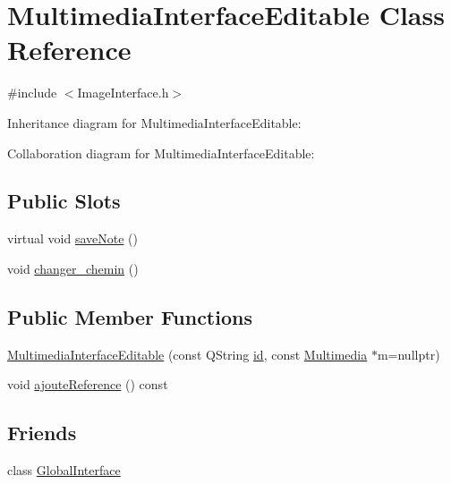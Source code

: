 \hypertarget{classMultimediaInterfaceEditable}{}\section{Multimedia\+Interface\+Editable Class Reference}
\label{classMultimediaInterfaceEditable}


{\ttfamily \#include $<$Image\+Interface.\+h$>$}



Inheritance diagram for Multimedia\+Interface\+Editable\+:


Collaboration diagram for Multimedia\+Interface\+Editable\+:
\subsection*{Public Slots}
\begin{DoxyCompactItemize}
\item 
virtual void \hyperlink{classMultimediaInterfaceEditable_a3b1ba30cbcf5d8276afd1674b1bb5885}{save\+Note} ()
\item 
void \hyperlink{classMultimediaInterfaceEditable_ab284b056d3eb91205da29aa78ccef7df}{changer\+\_\+chemin} ()
\end{DoxyCompactItemize}
\subsection*{Public Member Functions}
\begin{DoxyCompactItemize}
\item 
\hyperlink{classMultimediaInterfaceEditable_acaa968a37e43d20da750cb67fa50280e}{Multimedia\+Interface\+Editable} (const Q\+String \hyperlink{classNoteInterfaceEditable_a644ed9be4e9882c784a2667748d8501d}{id}, const \hyperlink{classMultimedia}{Multimedia} $\ast$m=nullptr)
\item 
void \hyperlink{classMultimediaInterfaceEditable_a0fc71cbf21a889fd89ea06eed65e103d}{ajoute\+Reference} () const 
\end{DoxyCompactItemize}
\subsection*{Friends}
\begin{DoxyCompactItemize}
\item 
class \hyperlink{classMultimediaInterfaceEditable_a2250a78aa5cceb79c3e34da3f1fe0fde}{Global\+Interface}
\end{DoxyCompactItemize}
